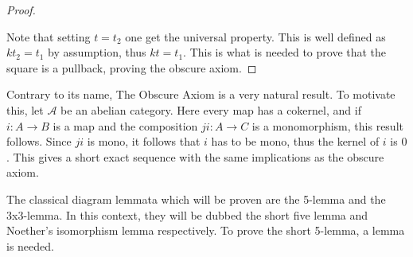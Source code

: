 \begin{proof}
\begin{center}
        \end{center}
        Note that setting $t=t_2$ one get the universal property. This is well defined as $kt_2=t_1$ by assumption, thus $kt=t_1$. This is what is needed to prove that the square is a pullback, proving the obscure axiom.
    \end{proof}

    Contrary to its name, The Obscure Axiom is a very natural result. To motivate this, let $\mathcal{A}$ be an abelian category. Here every map has a cokernel, and if $i : A \rightarrow B$ is a map and the composition $ji : A \rightarrow C$ is a monomorphism, this result follows. Since $ji$ is mono, it follows that $i$ has to be mono, thus the kernel of $i$ is $0$. This gives a short exact sequence with the same implications as the obscure axiom.
    \begin{center}
    \end{center}

    The classical diagram lemmata which will be proven are the 5-lemma and the 3x3-lemma. In this context, they will be dubbed the short five lemma and Noether's isomorphism lemma respectively. To prove the short 5-lemma, a lemma is needed.

